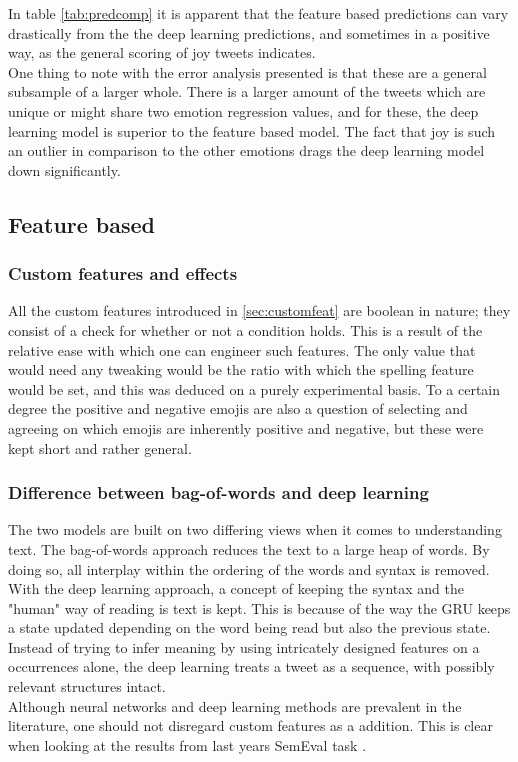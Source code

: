 In table \ref{tab:predcomp} it is apparent that the feature based predictions can vary drastically from the the deep learning predictions, and sometimes in a positive way, as the general scoring of joy tweets indicates.\\
One thing to note with the error analysis presented is that these are a general subsample of a larger whole. There is a larger amount of the tweets which are unique or might share two emotion regression values, and for these, the deep learning model is superior to the feature based model. The fact that joy is such an outlier in comparison to the other emotions drags the deep learning model down significantly.   

\subsection{Feature based}
\subsubsection{Custom features and effects}
All the custom features introduced in \ref{sec:customfeat} are boolean in nature; they consist of a check for whether or not a condition holds. This is a result of the relative ease with which one can engineer such features. The only value that would need any tweaking would be the ratio with which the spelling feature would be set, and this was deduced on a purely experimental basis. To a certain degree the positive and negative emojis are also a question of selecting and agreeing on which emojis are inherently positive and negative, but these were kept short and rather general.

\subsubsection{Difference between bag-of-words and deep learning}
The two models are built on two differing views when it comes to understanding text. The bag-of-words approach reduces the text to a large heap of words. By doing so, all interplay within the ordering of the words and syntax is removed. With the deep learning approach, a concept of keeping the syntax and the "human" way of reading is text is kept. This is because of the way the GRU keeps a state updated depending on the word being read but also the previous state. Instead of trying to infer meaning by using intricately designed features on a occurrences alone, the deep learning treats a tweet as a sequence, with possibly relevant structures intact. \\
Although neural networks and deep learning methods are prevalent in the literature, one should not disregard custom features as a addition. This is clear when looking at the results from last years SemEval task \cite{wassa2017}.

